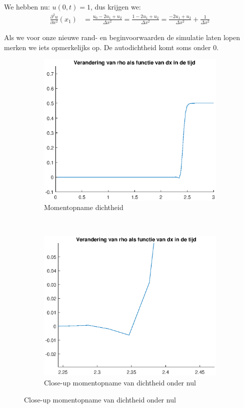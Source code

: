 \documentclass{article}
\begin{document}
We hebben nu: $u(0,t) = 1$, dus krijgen we:
\begin{align*}
\frac{\partial^2 u}{\partial x^2}(x_1) &= \frac{u_{0}-2u_1+u_{2}}{\Delta x^2}
= \frac{1-2u_1+u_{2}}{\Delta x^2}
= \frac{-2u_1+u_{2}}{\Delta x^2} +\frac{1}{\Delta x^2}
\end{align*}

Als we voor onze nieuwe rand- en beginvoorwaarden de simulatie laten lopen merken we iets opmerkelijks op.
De autodichtheid komt soms onder $0$.
\begin{figure}[H]
\begin{subfigure}{0.45\textwidth}
\includegraphics[scale=0.5]{6gek.eps}
\caption{Momentopname dichtheid}
\end{subfigure}
~
\begin{subfigure}{0.45\textwidth}
\includegraphics[scale=0.5]{6gekc.eps}
\caption{Close-up momentopname van dichtheid onder nul}
\end{subfigure}
\end{figure}
\end{document}
